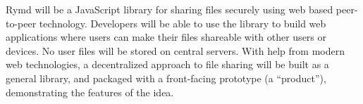 Rymd will be a JavaScript library for sharing files securely using web based peer-to-peer technology. Developers will be able to use the library to build web applications where users can make their files shareable with other users or devices. No user files will be stored on central servers. With help from modern web technologies, a decentralized approach to file sharing will be built as a general library, and packaged with a front-facing prototype (a “product”), demonstrating the features of the idea.


